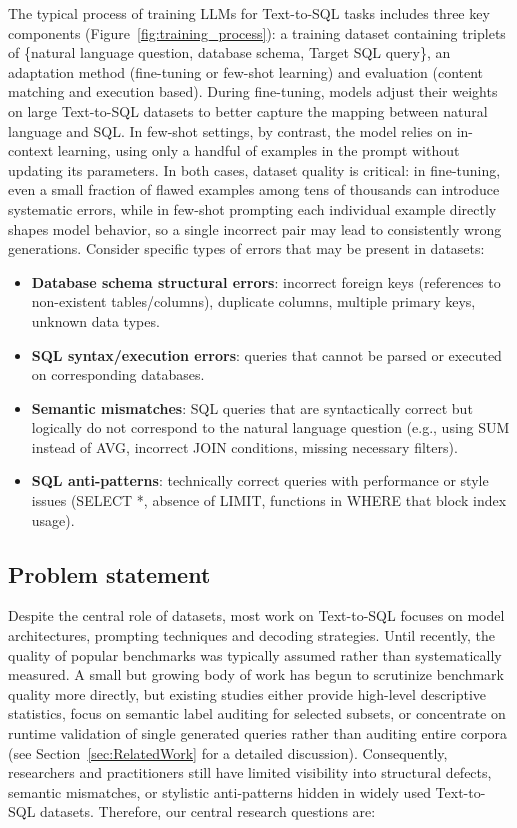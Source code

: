 \documentclass[]{einformatica}
\begin{document}
The typical process of training LLMs for Text-to-SQL tasks includes three key components (Figure~\ref{fig:training_process}): a training dataset containing triplets of \{natural language question, database schema, Target SQL query\}, an adaptation method (fine-tuning or few-shot learning) and evaluation (content matching and execution based). During fine-tuning, models adjust their weights on large Text-to-SQL datasets to better capture the mapping between natural language and SQL. In few-shot settings, by contrast, the model relies on in-context learning, using only a handful of examples in the prompt without updating its parameters. In both cases, dataset quality is critical: in fine-tuning, even a small fraction of flawed examples among tens of thousands can introduce systematic errors, while in few-shot prompting each individual example directly shapes model behavior, so a single incorrect pair may lead to consistently wrong generations. Consider specific types of errors that may be present in datasets:

\begin{itemize}
\item \textbf{Database schema structural errors}: incorrect foreign keys (references to non-existent tables/columns), duplicate columns, multiple primary keys, unknown data types.
\item \textbf{SQL syntax/execution errors}: queries that cannot be parsed or executed on corresponding databases.
\item \textbf{Semantic mismatches}: SQL queries that are syntactically correct but logically do not correspond to the natural language question (e.g., using SUM instead of AVG, incorrect JOIN conditions, missing necessary filters).
\item \textbf{SQL anti-patterns}: technically correct queries with performance or style issues (SELECT *, absence of LIMIT, functions in WHERE that block index usage).
\end{itemize}

\subsection*{Problem statement}
Despite the central role of datasets, most work on Text-to-SQL focuses on model architectures, prompting techniques and decoding strategies. Until recently, the quality of popular benchmarks was typically assumed rather than systematically measured. A small but growing body of work has begun to scrutinize benchmark quality more directly, but existing studies either provide high-level descriptive statistics, focus on semantic label auditing for selected subsets, or concentrate on runtime validation of single generated queries rather than auditing entire corpora (see Section~\ref{sec:RelatedWork} for a detailed discussion). Consequently, researchers and practitioners still have limited visibility into structural defects, semantic mismatches, or stylistic anti-patterns hidden in widely used Text-to-SQL datasets. Therefore, our central research questions are:
\end{document}
